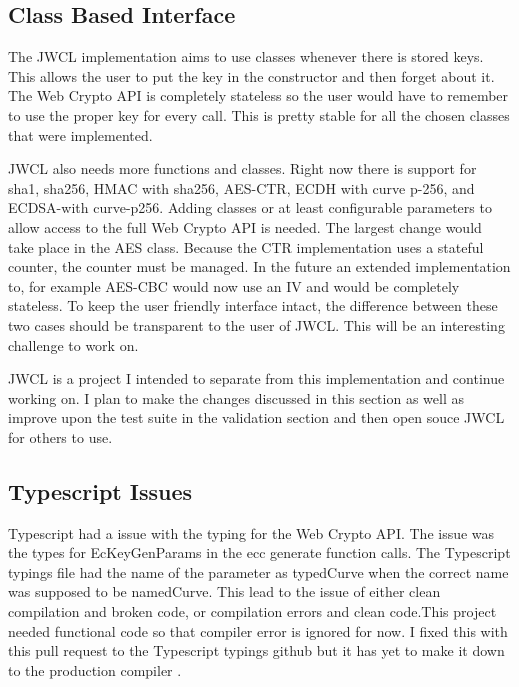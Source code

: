 \subsection{Class Based Interface}


The JWCL implementation aims to use classes whenever there is stored keys. This allows the user to put the key in the constructor and then forget about it. The Web Crypto API is completely stateless so the user would have to remember to use the proper key for every call. This is pretty stable for all the chosen classes that were implemented.


JWCL also needs more functions and classes. Right now there is support for sha1, sha256, HMAC with sha256, AES-CTR, ECDH with curve p-256, and ECDSA-with curve-p256. Adding classes or at least configurable parameters to allow access to the full Web Crypto API is needed. The largest change would take place in the AES class. Because the CTR implementation uses a stateful counter, the counter must be managed. In the future an extended implementation to, for example AES-CBC would now use an IV and would be completely stateless. To keep the user friendly interface intact, the difference between these two cases should be transparent to the user of JWCL. This will be an interesting challenge to work on. 


JWCL is a project I intended to separate from this implementation and continue working on. I plan to make the changes discussed in this section as well as improve upon the test suite in the validation section and then open souce JWCL for others to use.


\subsection{Typescript Issues}


Typescript had a issue with the typing for the Web Crypto API. The issue was the types for EcKeyGenParams in the ecc generate function calls. The Typescript typings file had the name of the parameter as typedCurve when the correct name was supposed to be namedCurve. This lead to the issue of either clean compilation and broken code, or compilation errors and clean code.This project needed functional code so that compiler error is ignored for now. I fixed this with this pull request to the Typescript typings github but it has yet to make it down to the production compiler \cite{ts-pull}. 



